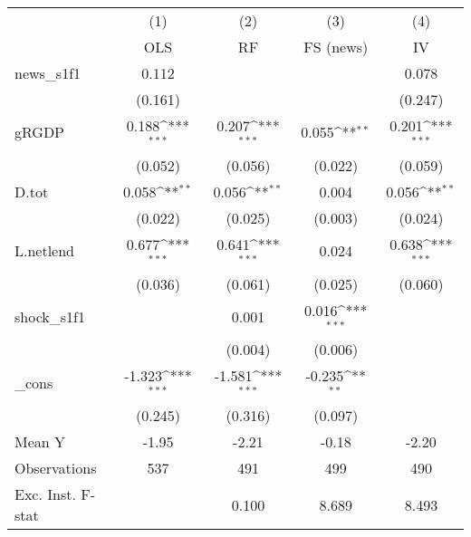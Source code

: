 {
\def\sym#1{\ifmmode^{#1}\else\(^{#1}\)\fi}
\begin{tabular}{l*{4}{c}}
\toprule
            &\multicolumn{1}{c}{(1)}&\multicolumn{1}{c}{(2)}&\multicolumn{1}{c}{(3)}&\multicolumn{1}{c}{(4)}\\
            &\multicolumn{1}{c}{OLS}&\multicolumn{1}{c}{RF}&\multicolumn{1}{c}{FS (news)}&\multicolumn{1}{c}{IV}\\
\midrule
news\_s1f1   &       0.112         &                     &                     &       0.078         \\
            &     (0.161)         &                     &                     &     (0.247)         \\
\addlinespace
gRGDP       &       0.188\sym{***}&       0.207\sym{***}&       0.055\sym{**} &       0.201\sym{***}\\
            &     (0.052)         &     (0.056)         &     (0.022)         &     (0.059)         \\
\addlinespace
D.tot       &       0.058\sym{**} &       0.056\sym{**} &       0.004         &       0.056\sym{**} \\
            &     (0.022)         &     (0.025)         &     (0.003)         &     (0.024)         \\
\addlinespace
L.netlend   &       0.677\sym{***}&       0.641\sym{***}&       0.024         &       0.638\sym{***}\\
            &     (0.036)         &     (0.061)         &     (0.025)         &     (0.060)         \\
\addlinespace
shock\_s1f1  &                     &       0.001         &       0.016\sym{***}&                     \\
            &                     &     (0.004)         &     (0.006)         &                     \\
\addlinespace
\_cons      &      -1.323\sym{***}&      -1.581\sym{***}&      -0.235\sym{**} &                     \\
            &     (0.245)         &     (0.316)         &     (0.097)         &                     \\
\midrule
Mean Y      &       -1.95         &       -2.21         &       -0.18         &       -2.20         \\
Observations&         537         &         491         &         499         &         490         \\
Exc. Inst. F-stat&                     &       0.100         &       8.689         &       8.493         \\
\bottomrule
\end{tabular}
}
